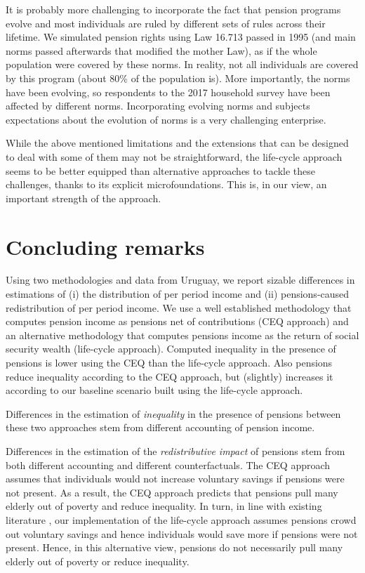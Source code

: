 \documentclass{article}
\begin{document}
It is probably more challenging to incorporate the fact that pension programs evolve and most individuals are ruled by different sets of rules across their lifetime. We simulated pension rights using Law 16.713 passed in 1995 (and main norms passed afterwards that modified the mother Law), as if the whole population were covered by these norms. In reality, not all individuals are covered by this program (about 80\% of the population is). More importantly, the norms have been evolving, so respondents to the 2017 household survey have been affected by different norms. Incorporating evolving norms and subjects expectations about the evolution of norms is a very challenging enterprise. 

While the above mentioned limitations and the extensions that can be designed to deal with some of them may not be straightforward, the life-cycle approach seems to be better equipped than alternative approaches to tackle these challenges, thanks to its explicit microfoundations. This is, in our view, an important strength of the approach.

\section{Concluding remarks}  \label{sec:concluding} 

 Using two methodologies and data from Uruguay, we report sizable differences in estimations of (i) the distribution of per period income and (ii) pensions-caused redistribution of per period income. We use a well established methodology that computes pension income as pensions net of contributions (CEQ approach) and an alternative methodology that computes pensions income as the return of social security wealth (life-cycle approach). Computed inequality in the presence of pensions is lower using the CEQ than the life-cycle  approach. Also pensions reduce inequality according to the CEQ approach, but (slightly) increases it according to our baseline scenario built using the life-cycle approach.   

Differences in the estimation of \textit{inequality} in the presence of pensions between these two approaches stem from different accounting of pension income. 
  
Differences in the estimation of the \textit{redistributive impact} of pensions stem from both different accounting and different counterfactuals. The CEQ approach assumes that individuals would not increase voluntary savings if pensions were not present. As a result, the CEQ approach predicts that pensions pull many elderly out of poverty and reduce inequality. In turn, in line with existing literature \parencite{Attanasio2003a, Attanasio2003b, Gale1998}, our implementation of the life-cycle approach assumes pensions crowd out voluntary savings and hence individuals would save more if pensions were not present. Hence, in this alternative view, pensions do not necessarily pull many elderly out of poverty or reduce inequality.  
  
\end{document}
